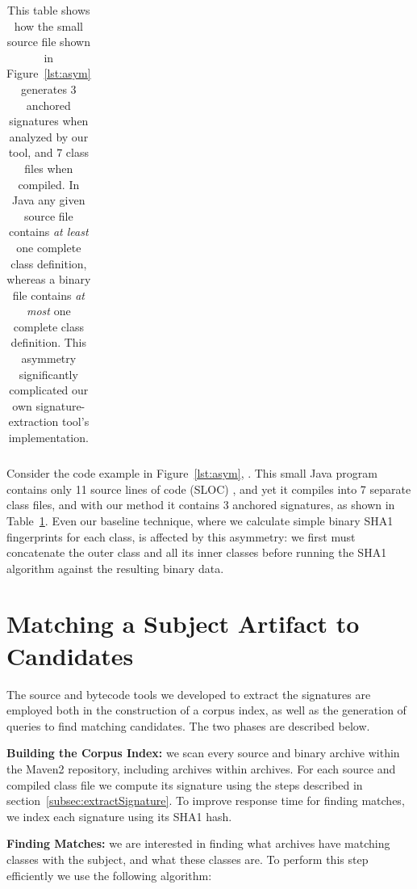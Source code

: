 \begin{table}[htbp]
\begin{tabular}{l|rl|r}
& & & \\
\hline
  \end{tabular}
  \vspace{1mm}
  \caption{This table shows how the small source file shown in Figure~\ref{lst:asym}
generates 3 anchored signatures when analyzed by our tool, and 7 class files when compiled.
In Java any given source file contains \emph{at least} one complete
class definition, whereas a binary file contains \emph{at most} one complete class
definition.  This asymmetry significantly complicated our own signature-extraction
tool's implementation.}
  \label{tab:asym}
\end{table}

Consider the code example in Figure~\ref{lst:asym}, .
This small Java program contains only 11 source lines of code (SLOC) \cite{wheelerSloc},
and yet it compiles into 7 separate class files, and with our method it
contains 3 anchored signatures, as shown in Table~\ref{tab:asym}.
Even our baseline technique, where we calculate simple binary SHA1 fingerprints for each class,
is affected by this asymmetry:  we first must concatenate the outer class and all its inner
classes before running the SHA1 algorithm against the resulting binary data.



\vspace{-1em}
\section{Matching a Subject Artifact to Candidates} %

The source and bytecode tools we developed to extract the signatures are
employed both in the construction of a corpus index, as well as the
generation of queries to find matching candidates.  The two phases are
described below.

\textbf{Building the Corpus Index:}
we scan every source and binary archive within the Maven2 repository,
including archives within archives.  For each source and compiled class
file we compute its signature using the steps described in
section~\ref{subsec:extractSignature}.  To improve response time for
finding matches, we index each signature using its SHA1 hash.

\textbf{Finding Matches:}
we are interested in finding what archives have matching classes with the
subject, and what these classes are. To perform this step efficiently we
use the following algorithm:

